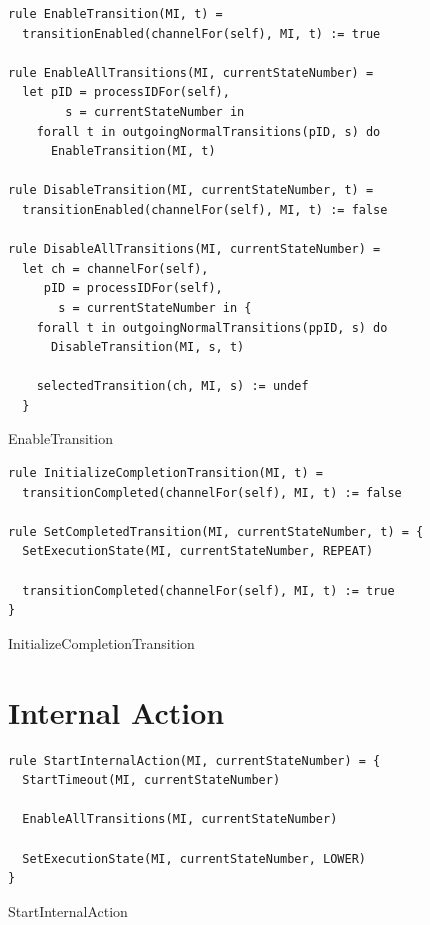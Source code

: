 \begin{listing}[H]
\begin{verbatim}
rule EnableTransition(MI, t) =
  transitionEnabled(channelFor(self), MI, t) := true

rule EnableAllTransitions(MI, currentStateNumber) =
  let pID = processIDFor(self),
        s = currentStateNumber in
    forall t in outgoingNormalTransitions(pID, s) do
      EnableTransition(MI, t)

rule DisableTransition(MI, currentStateNumber, t) =
  transitionEnabled(channelFor(self), MI, t) := false

rule DisableAllTransitions(MI, currentStateNumber) =
  let ch = channelFor(self),
     pID = processIDFor(self),
       s = currentStateNumber in {
    forall t in outgoingNormalTransitions(ppID, s) do
      DisableTransition(MI, s, t)

    selectedTransition(ch, MI, s) := undef
  }
\end{verbatim}
\caption{EnableTransition}
\label{lst:asm:EnableTransition}
\end{listing}


\begin{listing}[H]
\begin{verbatim}
rule InitializeCompletionTransition(MI, t) =
  transitionCompleted(channelFor(self), MI, t) := false

rule SetCompletedTransition(MI, currentStateNumber, t) = {
  SetExecutionState(MI, currentStateNumber, REPEAT)

  transitionCompleted(channelFor(self), MI, t) := true
}
\end{verbatim}
\caption{InitializeCompletionTransition}
\label{lst:asm:InitializeCompletionTransition}
\end{listing}



\section{Internal Action}


\begin{listing}[H]
\begin{verbatim}
rule StartInternalAction(MI, currentStateNumber) = {
  StartTimeout(MI, currentStateNumber)

  EnableAllTransitions(MI, currentStateNumber)

  SetExecutionState(MI, currentStateNumber, LOWER)
}
\end{verbatim}
\caption{StartInternalAction}
\label{lst:asm:StartInternalAction}
\end{listing}




